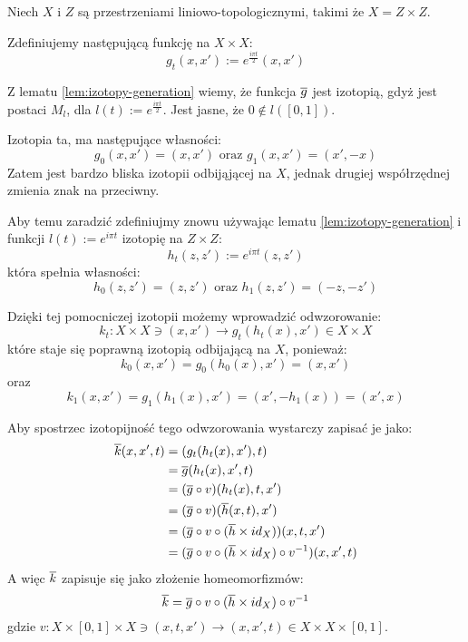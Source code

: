 \begin{ex} \label{rip-space}
  Niech $X$ i $Z$ są przestrzeniami liniowo-topologicznymi, takimi że $X = Z \times Z$.
  
  Zdefiniujemy następującą funkcję na $X \times X$:
  \[g_t(x,x') := e^{\frac{i \pi t}{2}} (x, x')\]
  
  Z lematu \ref{lem:izotopy-generation} wiemy, że funkcja $\overline{g}$ jest izotopią, gdyż jest postaci $M_l$, dla $l(t) := e^\frac{i \pi t}{2}$. Jest jasne, że $0 \not\in l([0,1])$.
  
  Izotopia ta, ma następujące własności:
  \[g_0(x,x') = (x,x') \mbox{ oraz } g_1(x,x') = (x', -x)\]
  Zatem jest bardzo bliska izotopii odbijąjącej na $X$, jednak drugiej współrzędnej zmienia znak na przeciwny.
  
  Aby temu zaradzić zdefiniujmy znowu używając lematu \ref{lem:izotopy-generation} i funkcji $l(t) := e^{i \pi t}$ izotopię na $Z \times Z$:
  \[h_t(z,z') := e^{i \pi t}(z, z')\]
  która spełnia własności:
  \[h_0(z,z') = (z,z') \mbox{ oraz } h_1(z,z') = (-z,-z')\]
  
  Dzięki tej pomocniczej izotopii możemy wprowadzić odwzorowanie:
  \[k_t: X \times X \ni (x, x') \rightarrow g_t(h_t(x), x') \in X \times X\]
  które staje się poprawną izotopią odbijającą na $X$, ponieważ:
  \[k_0(x,x') = g_0(h_0(x), x') = (x, x')\]
  oraz
  \[k_1(x,x') = g_1(h_1(x), x') = (x', -h_1(x)) = (x', x)\]
  
  Aby spostrzec izotopijność tego odwzorowania wystarczy zapisać je jako:
  \begin{align*}
    \overline{k}(x,x',t) &= (g_t(h_t(x), x'), t) \\
    &= \overline{g}(h_t(x), x', t) \\
    &= (\overline{g} \circ v)(h_t(x), t, x') \\
    &= (\overline{g} \circ v)(\overline{h}(x,t), x') \\
    &= (\overline{g} \circ v \circ (\overline{h} \times id_X))(x,t,x') \\
    &= (\overline{g} \circ v \circ (\overline{h} \times id_X) \circ v^{-1})(x,x',t)
  \end{align*}
  A więc $\overline{k}$ zapisuje się jako złożenie homeomorfizmów:
  \[\overline{k} = \overline{g} \circ v \circ (\overline{h} \times id_X) \circ v^{-1}\]
  gdzie $v: X \times [0,1] \times X \ni (x, t, x') \rightarrow (x, x', t) \in X \times X \times [0,1]$.
\end{ex}

